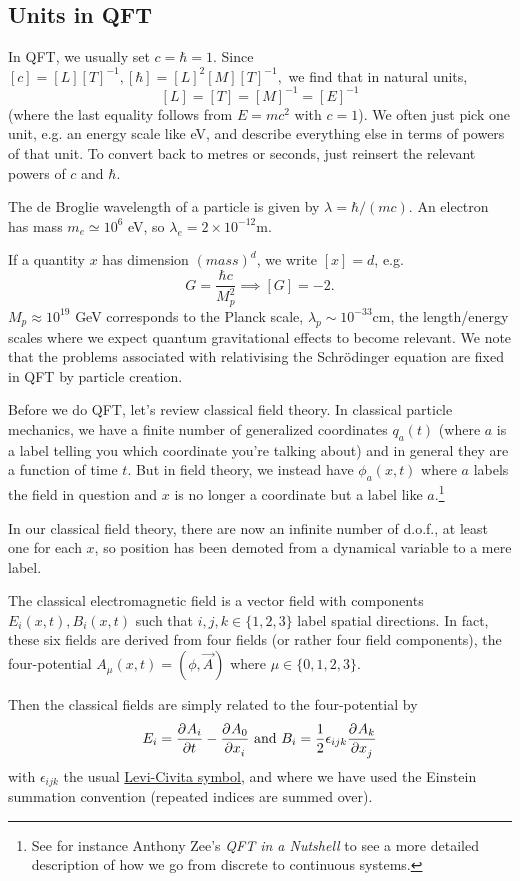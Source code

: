 \subsection*{Units in QFT} In QFT, we usually set $c=\hbar=1$. Since $[c]=[L][T]^{-1}, [\hbar]=[L]^2[M][T]^{-1},$ we find that in natural units, $$[L]=[T]=[M]^{-1}=[E]^{-1}$$ (where the last equality follows from $E=mc^2$ with $c=1$). We often just pick one unit, e.g. an energy scale like eV, and describe everything else in terms of powers of that unit. To convert back to metres or seconds, just reinsert the relevant powers of $c$ and $\hbar$.

\begin{exm}
The de Broglie wavelength of a particle is given by $\lambda=\hbar/(mc)$. An electron has mass $m_e\simeq 10^6$ eV, so $\lambda_e = 2\times 10^{-12}$m.
\end{exm}

If a quantity $x$ has dimension $(mass)^d$, we write $[x]=d$, e.g. $$G=\frac{\hbar c}{M_p^2}\implies [G]=-2.$$  $M_p \approx 10^{19}$ GeV corresponds to the Planck scale, $\lambda_p \sim 10^{-33}$cm, the length/energy scales where we expect quantum gravitational effects to become relevant. We note that the problems associated with relativising the Schr\"odinger equation are fixed in QFT by particle creation.

Before we do QFT, let's review classical field theory. In classical particle mechanics, we have a finite number of generalized coordinates $q_a(t)$ (where $a$ is a label telling you which coordinate you're talking about) and in general they are a function of time $t$. But in field theory, we instead have $\phi_a(x,t)$ where $a$ labels the field in question and $x$ is no longer a coordinate but a label like $a$.\footnote{See for instance Anthony Zee's \textit{QFT in a Nutshell} to see a more detailed description of how we go from discrete to continuous systems.}

In our classical field theory, there are now an infinite number of d.o.f., at least one for each $x$, so position has been demoted from a dynamical variable to a mere label.

\begin{exm}
The classical electromagnetic field is a vector field with components $E_i(x,t), B_i(x,t)$ such that $i,j,k\in \{1,2,3\}$ label spatial directions. In fact, these six fields are derived from four fields (or rather four field components), the four-potential $A_\mu(x,t)=(\phi,\vec{A})$ where $\mu\in\{0,1,2,3\}$.

Then the classical fields are simply related to the four-potential by
$$E_i=\P{A_i}{t}-\P{A_0}{x_i} \text{ and } B_i=\frac{1}{2}\epsilon_{ijk} \P{A_k}{x_j}$$
with $\epsilon_{ijk}$ the usual \href{https://en.wikipedia.org/wiki/Levi-Civita_symbol}{Levi-Civita symbol}, and where we have used the Einstein summation convention (repeated indices are summed over).
\end{exm}

